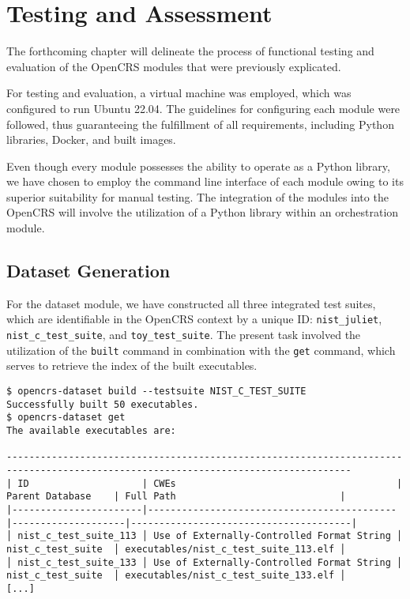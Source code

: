 \documentclass[../main.tex]{subfiles}
\begin{document}
\hypertarget{testing-and-assesment}{%
  \chapter{Testing and Assessment}\label{testing-and-assesment}}

The forthcoming chapter will delineate the process of functional testing and
evaluation of the OpenCRS modules that were previously explicated.

For testing and evaluation, a virtual machine was employed, which was
configured to run Ubuntu 22.04. The guidelines for configuring each module were
followed, thus guaranteeing the fulfillment of all requirements, including
Python libraries, Docker, and built images.

Even though every module possesses the ability to operate as a Python library,
we have chosen to employ the command line interface of each module owing to its
superior suitability for manual testing. The integration of the modules into
the OpenCRS will involve the utilization of a Python library within an
orchestration module.

\hypertarget{dataset-generation}{%
  \section{Dataset Generation}\label{dataset-generation}}

For the dataset module, we have constructed all three integrated test suites,
which are identifiable in the OpenCRS context by a unique ID:
\texttt{nist\_juliet}, \texttt{nist\_c\_test\_suite}, and
\texttt{toy\_test\_suite}. The present task involved the utilization of the
\texttt{built} command in combination with the \texttt{get} command, which
serves to retrieve the index of the built executables.

\begin{tiny}
\begin{verbatim}
$ opencrs-dataset build --testsuite NIST_C_TEST_SUITE
Successfully built 50 executables.
$ opencrs-dataset get
The available executables are:

-----------------------------------------------------------------------------------------------------------------------------------
| ID                    | CWEs                                       | Parent Database    | Full Path                             |
|-----------------------|--------------------------------------------|--------------------|---------------------------------------|
│ nist_c_test_suite_113 │ Use of Externally-Controlled Format String │ nist_c_test_suite  │ executables/nist_c_test_suite_113.elf │
│ nist_c_test_suite_133 │ Use of Externally-Controlled Format String │ nist_c_test_suite  │ executables/nist_c_test_suite_133.elf │
[...]
\end{verbatim}
\end{tiny}
\end{document}
